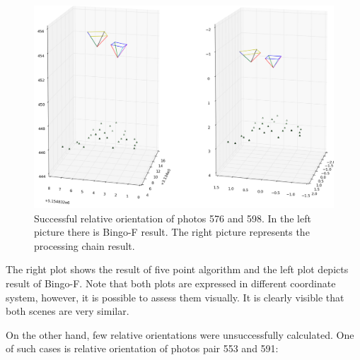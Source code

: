 \documentclass[a4paper,12pt]{article}
\begin{document}
\begin{center}
 \begin{figure}[!h]
    \includegraphics[scale=0.4]{figures/rel_or_576_598.png}
    \caption{Successful relative orientation of photos 576 and 598. In the left picture there 
    is Bingo-F result. The right picture represents the processing chain result.}
    \label{fig:rel_or_ok}
\end{figure}
\end{center}

The right plot shows the result of five point algorithm and the left plot depicts result of Bingo-F. Note that both 
plots are expressed in different coordinate system, however, it is possible to assess them visually. It is clearly visible
that both scenes are very similar.

On the other hand, few relative orientations were unsuccessfully calculated.  
One of such cases is relative orientation of photos pair 553 and 591:  

\end{document}
